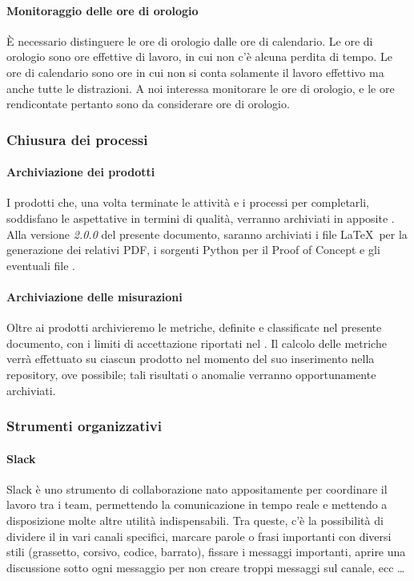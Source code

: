 		\paragraph{Monitoraggio delle ore di orologio}
		È necessario distinguere le ore di orologio dalle ore di calendario. Le ore di orologio sono ore effettive di lavoro, in
		cui non c'è alcuna perdita di tempo. Le ore di calendario sono ore in cui non si conta solamente il lavoro effettivo
		ma anche tutte le distrazioni. A noi interessa monitorare le ore di orologio, e le ore rendicontate pertanto sono da
		considerare ore di orologio.

		\subsubsection{Chiusura dei processi}

    		\paragraph{Archiviazione dei prodotti}
			I prodotti che, una volta terminate le attività e i processi per completarli, soddisfano le aspettative in termini di qualità,
			verranno archiviati in apposite . Alla versione \textit{2.0.0} del presente documento, saranno archiviati
			i file \LaTeX\ per la generazione dei relativi PDF, i sorgenti Python per il Proof of Concept e gli eventuali file .

    		\paragraph{Archiviazione delle misurazioni}
			Oltre ai prodotti archivieremo le metriche, definite e classificate nel presente documento, con i limiti di accettazione riportati nel \Doc{\PdQv}.
			Il calcolo delle metriche verrà effettuato su ciascun prodotto nel momento del suo inserimento nella repository, ove possibile; tali risultati
			o anomalie verranno opportunamente archiviati. %


    	\subsubsection{Strumenti organizzativi}\label{PianificazioneCoordinamento}

    		\paragraph{Slack}
			Slack è uno strumento di collaborazione nato appositamente per coordinare il lavoro tra i team, permettendo la comunicazione in tempo
			reale e mettendo a disposizione molte altre utilità indispensabili. Tra queste, c'è la possibilità di dividere il 
			in vari canali specifici, marcare parole o frasi importanti con diversi stili (grassetto, corsivo, codice, barrato), fissare i messaggi
			importanti, aprire una discussione sotto ogni messaggio per non creare troppi messaggi sul canale, ecc \dots

